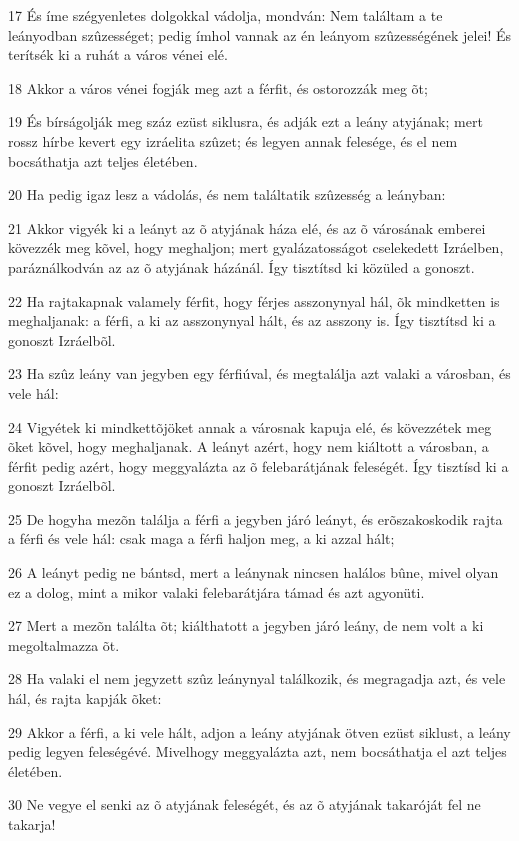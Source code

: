 \par 17 És íme szégyenletes dolgokkal vádolja, mondván: Nem találtam a te leányodban szûzességet; pedig ímhol vannak az én leányom szûzességének jelei! És terítsék ki a ruhát a város vénei elé.
\par 18 Akkor a város vénei fogják meg azt a férfit, és ostorozzák meg õt;
\par 19 És bírságolják meg száz ezüst siklusra, és adják ezt a leány atyjának; mert rossz hírbe kevert egy izráelita szûzet; és legyen annak felesége, és el nem bocsáthatja azt teljes életében.
\par 20 Ha pedig igaz lesz a vádolás, és nem találtatik szûzesség a leányban:
\par 21 Akkor vigyék ki a leányt az õ atyjának háza elé, és az õ városának emberei kövezzék meg kõvel, hogy meghaljon; mert gyalázatosságot cselekedett Izráelben, paráználkodván az az õ atyjának házánál. Így tisztítsd ki közüled a gonoszt.
\par 22 Ha rajtakapnak valamely férfit, hogy férjes asszonynyal hál, õk mindketten is meghaljanak: a férfi,  a ki az asszonynyal hált, és az asszony is. Így tisztítsd ki a gonoszt Izráelbõl.
\par 23 Ha szûz leány van jegyben egy férfiúval, és megtalálja azt valaki a városban, és vele hál:
\par 24 Vigyétek ki mindkettõjöket annak a városnak kapuja elé, és kövezzétek meg õket kõvel, hogy meghaljanak. A leányt azért, hogy nem kiáltott a városban, a férfit pedig  azért, hogy meggyalázta az õ felebarátjának feleségét. Így tisztísd ki a gonoszt Izráelbõl.
\par 25 De hogyha mezõn találja a férfi a jegyben járó leányt, és erõszakoskodik rajta a férfi és vele hál: csak maga a férfi haljon meg, a ki azzal hált;
\par 26 A leányt pedig ne bántsd, mert a leánynak nincsen halálos bûne, mivel olyan ez a dolog, mint a mikor valaki felebarátjára támad és azt agyonüti.
\par 27 Mert a mezõn találta õt; kiálthatott a jegyben járó leány, de nem volt a ki megoltalmazza õt.
\par 28 Ha valaki el nem jegyzett szûz leánynyal találkozik, és megragadja azt, és vele hál, és rajta kapják õket:
\par 29 Akkor a férfi, a ki vele hált, adjon a leány atyjának ötven ezüst siklust, a leány pedig legyen feleségévé. Mivelhogy meggyalázta azt, nem bocsáthatja el azt teljes életében.
\par 30 Ne vegye el senki az õ atyjának feleségét, és az õ atyjának takaróját fel ne takarja!

